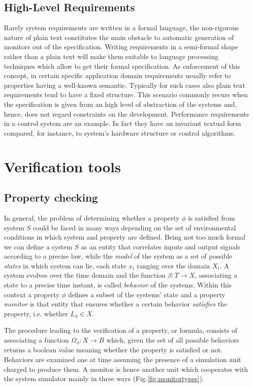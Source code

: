 \subsection{High-Level Requirements}
Rarely system requirements are written in a formal language, the non-rigorous nature of plain text constitutes the main obstacle to automatic generation of monitors out of the specification. Writing requirements in a semi-formal shape rather than a plain text will make them suitable to language processing techniques which allow to get their formal specification. As enforcement of this concept, in certain specific application domain requirements usually refer to properties having a well-known semantic. Typically for such cases also plain text requirements tend to have a fixed structure. This scenario commonly recurs when the specification is given from an high level of abstraction of the systems and, hence, does not regard constraints on the development. Performance requirements in a control system are an example. In fact they have an invariant textual form compared, for instance, to system's hardware structure or control algorithms.
\section{Verification tools}

\subsection{Property checking}

In general, the problem of determining whether a property $\phi$ is satisfied from system $S$ could be faced in many ways depending on the set of environmental conditions in which system and property are defined. Being not too much formal we can define a system $S$ as an entity that correlates inputs and output signals according to a precise law, while the \textit{model} of the system as a set of possible \textit{states} in which system can lie, each state $x_{i}$ ranging over the domain $X_{i}$. A system evolves over the time domain and the function $\beta :T\rightarrow X$, associating a state to a precise time instant, is called \textit{behavior} of the systems. 
Within this context a property $\phi$ defines a subset of the systems' state and a property \textit{monitor} is that entity that ensures whether a certain behavior \textit{satisfies} the property, i.e. whether $L_{\phi}\in X$.
\par The procedure leading to the verification of a property, or formula, consists of associating a function $\Omega_{\phi}:X\rightarrow B$ which, given the set of all possible behaviors returns a boolean value meaning whether the property is satisfied or not. Behaviors are examined one at time assuming the presence of a simulation unit charged to produce them. 
A monitor is hence another unit which cooperates with the system simulator mainly in three ways (Fig.\ref{fig:monitortypes}). 

